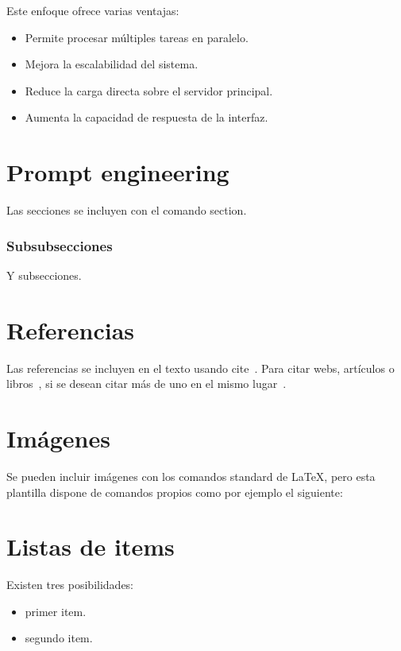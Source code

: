 Este enfoque ofrece varias ventajas:
\begin{itemize}
    \item Permite procesar múltiples tareas en paralelo.
    \item Mejora la escalabilidad del sistema.
    \item Reduce la carga directa sobre el servidor principal.
    \item Aumenta la capacidad de respuesta de la interfaz.
\end{itemize}



\section{Prompt engineering}

Las secciones se incluyen con el comando section.

\subsubsection{Subsubsecciones}

Y subsecciones. 


\section{Referencias}

Las referencias se incluyen en el texto usando cite~\cite{wiki:latex}. Para citar webs, artículos o libros~\cite{koza92}, si se desean citar más de uno en el mismo lugar~\cite{bortolot2005, koza92}.


\section{Imágenes}

Se pueden incluir imágenes con los comandos standard de \LaTeX, pero esta plantilla dispone de comandos propios como por ejemplo el siguiente:




\section{Listas de items}

Existen tres posibilidades:

\begin{itemize}
	\item primer item.
	\item segundo item.
\end{itemize}


